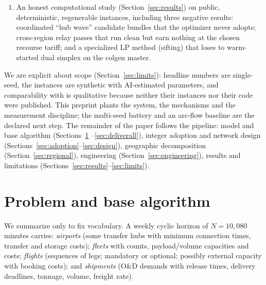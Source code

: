 \documentclass[11pt]{article}
\begin{document}
\begin{enumerate}
  \cite{farley1990} under truncation with a membership filter, and
  per-iteration cost breakdowns that make the next bottleneck visible
  instead of guessed. Mispricing-safe dual smoothing
  \cite{wentges1997,dumerle1999} is implemented and correctness-verified;
  its performance evaluation belongs to the planned battery and no benefit
  is claimed here.
\item An honest computational study (Section~\ref{sec:results}) on public,
  deterministic, regenerable instances, including three negative results:
  coordinated ``hub wave'' candidate bundles that the optimizer never
  adopts; cross-region relay passes that run clean but earn nothing at the
  chosen recourse tariff; and a specialized LP method (sifting) that loses
  to warm-started dual simplex on the colgen master.
\end{enumerate}

We are explicit about scope (Section~\ref{sec:limits}): headline numbers are
single-seed, the instances are synthetic with AI-estimated parameters, and
comparability with \cite{derigs2013} is qualitative because neither their
instances nor their code were published. This preprint plants the system,
the mechanisms and the measurement discipline; the multi-seed battery and an
arc-flow baseline are the declared next step. The remainder of the paper
follows the pipeline: model and base algorithm (Sections~\ref{sec:base}%
--\ref{sec:deliverall}), integer adoption and network design
(Sections~\ref{sec:adoption}--\ref{sec:design}), geographic decomposition
(Section~\ref{sec:regional}), engineering (Section~\ref{sec:engineering}),
results and limitations (Sections~\ref{sec:results}--\ref{sec:limits}).

\section{Problem and base algorithm}\label{sec:base}

We summarize \cite{derigs2013} only to fix vocabulary. A weekly cyclic
horizon of $N=10{,}080$ minutes carries: \emph{airports} (some transfer
hubs with minimum connection times, transfer and storage costs);
\emph{fleets} with counts, payload/volume capacities and costs;
\emph{flights} (sequences of legs; mandatory or optional; possibly external
capacity with booking costs); and \emph{shipments} (O\&D demands with
release times, delivery deadlines, tonnage, volume, freight rate).
\end{document}
